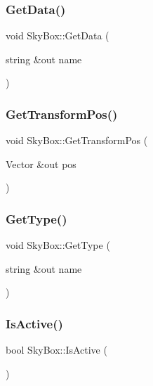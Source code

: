 \hypertarget{class_sky_box_a9ad51c899f751e9a985ef738712e4ccc}{}\label{class_sky_box_a9ad51c899f751e9a985ef738712e4ccc} 
\subsubsection{\texorpdfstring{Get\+Data()}{GetData()}}
{\footnotesize\ttfamily void Sky\+Box\+::\+Get\+Data (\begin{DoxyParamCaption}\item[{string \&out}]{name }\end{DoxyParamCaption})}

\hypertarget{class_sky_box_aabebff73a8e53c8d42b9ca496f9e2d70}{}\label{class_sky_box_aabebff73a8e53c8d42b9ca496f9e2d70} 
\subsubsection{\texorpdfstring{Get\+Transform\+Pos()}{GetTransformPos()}}
{\footnotesize\ttfamily void Sky\+Box\+::\+Get\+Transform\+Pos (\begin{DoxyParamCaption}\item[{Vector \&out}]{pos }\end{DoxyParamCaption})}

\hypertarget{class_sky_box_a2b8b43680e31680bf9e523d2f1fe68a3}{}\label{class_sky_box_a2b8b43680e31680bf9e523d2f1fe68a3} 
\subsubsection{\texorpdfstring{Get\+Type()}{GetType()}}
{\footnotesize\ttfamily void Sky\+Box\+::\+Get\+Type (\begin{DoxyParamCaption}\item[{string \&out}]{name }\end{DoxyParamCaption})}

\hypertarget{class_sky_box_acfbc602464a279bb0dceccaef7a43fd8}{}\label{class_sky_box_acfbc602464a279bb0dceccaef7a43fd8} 
\subsubsection{\texorpdfstring{Is\+Active()}{IsActive()}}
{\footnotesize\ttfamily bool Sky\+Box\+::\+Is\+Active (\begin{DoxyParamCaption}{ }\end{DoxyParamCaption})}

